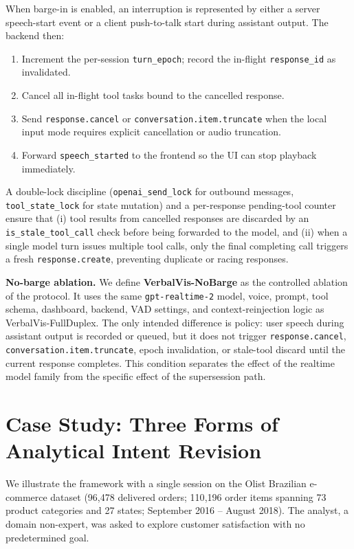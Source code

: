 \documentclass[journal]{IEEEtran}
\begin{document}
When barge-in is enabled, an interruption is represented by either a server speech-start event or a client push-to-talk start during assistant output. The backend then:
\begin{enumerate}
\item Increment the per-session \texttt{turn\_epoch}; record the in-flight \texttt{response\_id} as invalidated.
\item Cancel all in-flight tool tasks bound to the cancelled response.
\item Send \texttt{response.cancel} or \texttt{conversation.item.truncate} when the local input mode requires explicit cancellation or audio truncation.
\item Forward \texttt{speech\_started} to the frontend so the UI can stop playback immediately.
\end{enumerate}
A double-lock discipline (\texttt{openai\_send\_lock} for outbound messages, \texttt{tool\_state\_lock} for state mutation) and a per-response pending-tool counter ensure that (i) tool results from cancelled responses are discarded by an \texttt{is\_stale\_tool\_call} check before being forwarded to the model, and (ii) when a single model turn issues multiple tool calls, only the final completing call triggers a fresh \texttt{response.create}, preventing duplicate or racing responses.

\noindent\textbf{No-barge ablation.}
We define \textbf{VerbalVis-NoBarge} as the controlled ablation of the protocol. It uses the same \texttt{gpt-realtime-2} model, voice, prompt, tool schema, dashboard, backend, VAD settings, and context-reinjection logic as VerbalVis-FullDuplex. The only intended difference is policy: user speech during assistant output is recorded or queued, but it does not trigger \texttt{response.cancel}, \texttt{conversation.item.truncate}, epoch invalidation, or stale-tool discard until the current response completes. This condition separates the effect of the realtime model family from the specific effect of the supersession path.

\section{Case Study: Three Forms of Analytical Intent Revision}
\label{sec:case}

We illustrate the framework with a single session on the Olist Brazilian e-commerce dataset (96{,}478 delivered orders; 110{,}196 order items spanning 73 product categories and 27 states; September 2016 -- August 2018). The analyst, a domain non-expert, was asked to explore customer satisfaction with no predetermined goal.
\end{document}
